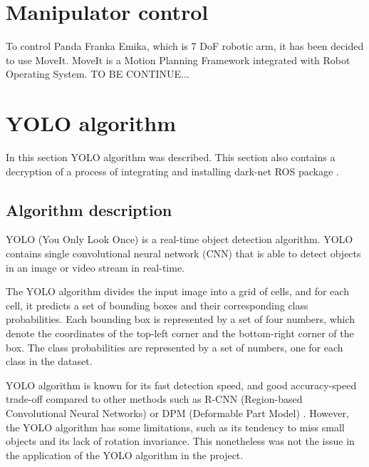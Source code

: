\documentclass[conference,a4paper]{IEEEtran}
\begin{document}
\section{Manipulator control}
To control Panda Franka Emika, which is 7 DoF robotic arm, it has been decided to use MoveIt. MoveIt is a Motion Planning Framework integrated with Robot Operating System. TO BE CONTINUE...



\section{YOLO algorithm}
In this section YOLO algorithm was described. This section also contains a decryption of a process of integrating and installing dark-net ROS package \cite{YOLO_ROS}.

\subsection{Algorithm description}
YOLO (You Only Look Once) is a real-time object detection algorithm. YOLO contains single convolutional neural network (CNN) that is able to detect objects in an image or video stream in real-time. 

The YOLO algorithm divides the input image into a grid of cells, and for each cell, it predicts a set of bounding boxes and their corresponding class probabilities. Each bounding box is represented by a set of four numbers, which denote the coordinates of the top-left corner and the bottom-right corner of the box. The class probabilities are represented by a set of numbers, one for each class in the dataset.

YOLO algorithm is known for its fast detection speed, and good accuracy-speed trade-off compared to other methods such as R-CNN (Region-based Convolutional Neural Networks) or DPM (Deformable Part Model) \cite{YOLO_paper}. However, the YOLO algorithm has some limitations, such as its tendency to miss small objects and its lack of rotation invariance. This nonetheless was not the issue in the application of the YOLO algorithm in the project. 
\end{document}
